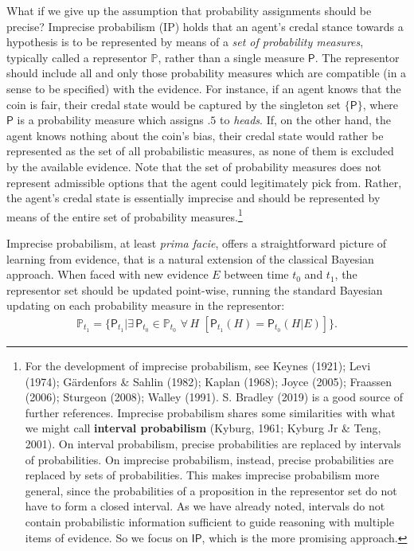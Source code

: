 \documentclass[
  10pt,
  dvipsnames,enabledeprecatedfontcommands]{scrartcl}
\newcommand{\s}[1]{\mbox{$\mathsf{#1}$}}
\begin{document}
What if we give up the assumption that probability assignments should be
precise? Imprecise probabilism (\textsf{IP}) holds that an agent's
credal stance towards a hypothesis is to be represented by means of a
\emph{set of probability measures}, typically called a representor
\(\mathbb{P}\), rather than a single measure \(\mathsf{P}\). The
representor should include all and only those probability measures which
are compatible (in a sense to be specified) with the evidence. For
instance, if an agent knows that the coin is fair, their credal state
would be captured by the singleton set \(\{\mathsf{P}\}\), where
\(\mathsf{P}\) is a probability measure which assigns \(.5\) to
\emph{heads}. If, on the other hand, the agent knows nothing about the
coin's bias, their credal state would rather be represented as the set
of all probabilistic measures, as none of them is excluded by the
available evidence. Note that the set of probability measures does not
represent admissible options that the agent could legitimately pick
from. Rather, the agent's credal state is essentially imprecise and
should be represented by means of the entire set of probability
measures.\footnote{For the development of imprecise probabilism, see
  Keynes (1921); Levi (1974); Gärdenfors \& Sahlin (1982); Kaplan
  (1968); Joyce (2005); Fraassen (2006); Sturgeon (2008); Walley (1991).
  S. Bradley (2019) is a good source of further references. Imprecise
  probabilism shares some similarities with what we might call
  \textbf{interval probabilism} (Kyburg, 1961; Kyburg Jr \& Teng, 2001).
  On interval probabilism, precise probabilities are replaced by
  intervals of probabilities. On imprecise probabilism, instead, precise
  probabilities are replaced by sets of probabilities. This makes
  imprecise probabilism more general, since the probabilities of a
  proposition in the representor set do not have to form a closed
  interval. As we have already noted, intervals do not contain
  probabilistic information sufficient to guide reasoning with multiple
  items of evidence. So we focus on \s{IP}, which is the more promising
  approach.}

Imprecise probabilism, at least \emph{prima facie}, offers a
straightforward picture of learning from evidence, that is a natural
extension of the classical Bayesian approach. When faced with new
evidence \(E\) between time \(t_0\) and \(t_1\), the representor set
should be updated point-wise, running the standard Bayesian updating on
each probability measure in the representor:
\begin{align*} \label{eq:updateRepresentor}
\mathbb{P}_{t_1} = \{\mathsf{P}_{t_1}\vert \exists\, {\mathsf{P}_{t_0} \!\in  \mathbb{P}_{t_0}}\,\, \forall\, {H}\,\, \left[\mathsf{P}_{t_1}(H)=\mathsf{P}_{t_0}(H \vert E)\right] \}.
\end{align*}
\end{document}
